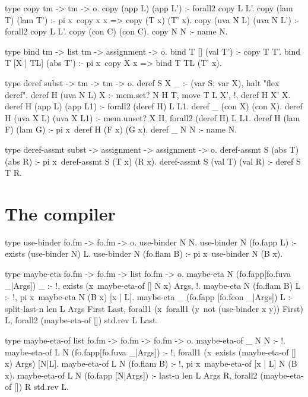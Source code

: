 \begin{elpicode}
  type copy tm -> tm -> o.
  copy (app L)   (app L') :- forall2 copy L L'.
  copy (lam T)   (lam T') :- pi x\ copy x x => copy (T x) (T' x).
  copy (uva N L) (uva N L') :- forall2 copy L L'.
  copy (con C)   (con C).
  copy N N :- name N.

  type bind tm -> list tm -> assignment -> o.
  bind T [] (val T') :- copy T T'.
  bind T [X | TL] (abs T') :- pi x\ copy X x => bind T TL (T' x).

  type deref subst -> tm -> tm -> o.
  deref S X _ :- (var S; var X), halt "flex deref".
  deref H (uva N L)  X         :- mem.set? N H T, 
    move T L X', !, deref H X' X.
  deref H (app L)   (app L1)   :- forall2 (deref H) L L1.
  deref _ (con X)   (con X).
  deref H (uva X L) (uva X L1) :- mem.unset? X H, 
    forall2 (deref H) L L1.
  deref H (lam F)   (lam G)    :- pi x\ deref H (F x) (G x).
  deref _ N         N          :- name N.

  type deref-assmt subst -> assignment -> assignment -> o.
  deref-assmt S (abs T) (abs R) :- pi x\ deref-assmt S (T x) (R x).
  deref-assmt S (val T) (val R) :- deref S T R.

\section{The compiler}

\begin{elpicode}
  type use-binder fo.fm -> fo.fm -> o.
  use-binder N N.
  use-binder N (fo.fapp L) :- exists (use-binder N) L.
  use-binder N (fo.flam B) :- pi x\ use-binder N (B x).

  type maybe-eta fo.fm -> fo.fm -> list fo.fm -> o.
  maybe-eta N (fo.fapp[fo.fuva _|Args]) _ :- !,
    exists (x\ maybe-eta-of [] N x) Args, !. 
  maybe-eta N (fo.flam B) L :- !, pi x\ maybe-eta N (B x) [x | L].
  maybe-eta _ (fo.fapp [fo.fcon _|Args]) L :-
    split-last-n {len L} Args First Last,
    forall1 (x\ forall1 (y\ not (use-binder x y)) First) L,
    forall2 (maybe-eta-of []) {std.rev L} Last.

  type maybe-eta-of list fo.fm -> fo.fm -> fo.fm -> o.
  maybe-eta-of _ N N :- !.
  maybe-eta-of L N (fo.fapp[fo.fuva _|Args]) :- !, 
    forall1 (x\ exists (maybe-eta-of [] x) Args) [N|L]. 
  maybe-eta-of L N (fo.flam B) :- !, 
    pi x\ maybe-eta-of [x | L] N (B x).
  maybe-eta-of L N (fo.fapp [N|Args]) :-
    last-n {len L} Args R,
    forall2 (maybe-eta-of []) R {std.rev L}.


\end{elpicode}
\end{elpicode}
